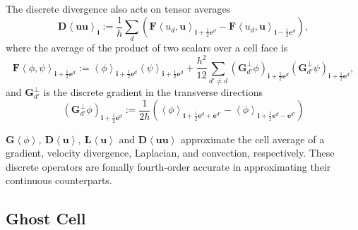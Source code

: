 The discrete divergence also acts on tensor averages
\begin{equation}
  \label{eq:Duu}
  \mathbf{D}\left<\mathbf{uu}\right>_{\mathbf{i}} :=
  \frac{1}{h}\sum\limits_d\left(
    \mathbf{F}\left<u_d,\mathbf{u}\right>_{\mathbf{i}+\frac{1}{2}\mathbf{e}^d}
    -
    \mathbf{F}\left<u_d,\mathbf{u}\right>_{\mathbf{i}-\frac{1}{2}\mathbf{e}^d}  \right),
\end{equation}
where the average of the product of two scalars over a cell face is
\begin{equation}
  \label{eq:ProductOf2scalar}
  \mathbf{F}\left<\phi,\psi\right>_{\mathbf{i}+\frac{1}{2}\mathbf{e}^d}
  :=
  \left<\phi\right>_{\mathbf{i}+\frac{1}{2}\mathbf{e}^d}
  \left<\psi\right>_{\mathbf{i}+\frac{1}{2}\mathbf{e}^d}+
  \frac{h^2}{12}\sum\limits_{d'\neq
    d}\left(\mathbf{G}^{\perp}_{d'}\phi\right)_{\mathbf{i}+\frac{1}{2}\mathbf{e}^d}
  \left(\mathbf{G}^{\perp}_{d'}\psi\right)_{\mathbf{i}+\frac{1}{2}\mathbf{e}^d},
\end{equation}
and $\mathbf{G}^{\perp}_{d'}$ is the discrete gradient in the
transverse directions
\begin{equation}
  \label{eq:TransverseG}
  \left(\mathbf{G}^{\perp}_{d'}\phi\right)_{\mathbf{i}+\frac{1}{2}\mathbf{e}^d}
  :=
  \frac{1}{2h}\left(\left<\phi\right>_{\mathbf{i}+\frac{1}{2}\mathbf{e}^d+\mathbf{e}^{d'}}-
  \left<\phi\right>_{\mathbf{i}+\frac{1}{2}\mathbf{e}^d-\mathbf{e}^{d'}}
 \right)
\end{equation}

$\mathbf{G}\left<\phi\right>,\ \mathbf{D}\left<\mathbf{u}\right>,\
\mathbf{L}\left<\mathbf{u}\right>$ and 
$\mathbf{D}\left<\mathbf{uu}\right>$ approximate the cell average of a
gradient, velocity divergence, Laplacian, and convection,
respectively. These discrete operators are fomally fourth-order
accurate in approximating their continuous
counterparts.\cite{zhang_fourth-order_2014}\cite{zhang_fourth-order_2012}

\subsection{Ghost Cell}
\label{sec:GhostCell}

